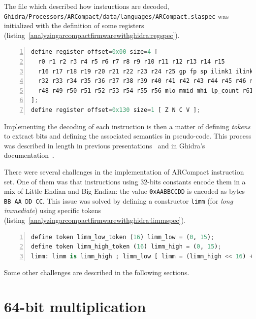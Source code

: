 The file which described how instructions are decoded,
\texttt{Ghidra/Processors/ARCompact/data/languages/ARCompact.slaspec}
was initialized with the definition of some registers
(listing~\ref{analyzingarcompactfirmwarewithghidra:regspec}).

\begin{lstlisting}[language=Python, numbers=left, caption={SLEIGH specification of ARCompact core registers}, label=analyzingarcompactfirmwarewithghidra:regspec]
define register offset=0x00 size=4 [
  r0 r1 r2 r3 r4 r5 r6 r7 r8 r9 r10 r11 r12 r13 r14 r15
  r16 r17 r18 r19 r20 r21 r22 r23 r24 r25 gp fp sp ilink1 ilink2 blink
  r32 r33 r34 r35 r36 r37 r38 r39 r40 r41 r42 r43 r44 r45 r46 r47
  r48 r49 r50 r51 r52 r53 r54 r55 r56 mlo mmid mhi lp_count r61reserved r62limm pcl
];
define register offset=0x130 size=1 [ Z N C V ];
\end{lstlisting}

Implementing the decoding of each instruction is then a matter of
defining \emph{tokens} to extract bits and defining the associated
semantics in pseudo-code. This process was described in length in
previous
presentations~\cite{analyzingarcompactfirmwarewithghidra:beerump2019mep}
and in Ghidra's
documentation~\cite{analyzingarcompactfirmwarewithghidra:ghidradoclanguage}.

There were several challenges in the implementation of ARCompact
instruction set. One of them was that instructions using 32-bits
constants encode them in a mix of Little Endian and Big Endian: the
value \texttt{0xAABBCCDD} is encoded as bytes
\texttt{BB AA DD CC}. This issue was solved by defining
a constructor \texttt{limm} (for \emph{long immediate})
using specific tokens
(listing~\ref{analyzingarcompactfirmwarewithghidra:limmspec}).

\begin{lstlisting}[language=Python, numbers=left, caption={SLEIGH specification of the decoding of 32-bit immediate values}, label=analyzingarcompactfirmwarewithghidra:limmspec]
define token limm_low_token (16) limm_low = (0, 15);
define token limm_high_token (16) limm_high = (0, 15);
limm: limm is limm_high ; limm_low [ limm = (limm_high << 16) + limm_low; ] { export *[const]:4 limm; }
\end{lstlisting}

Some other challenges are described in the following sections.

\section{64-bit multiplication}


